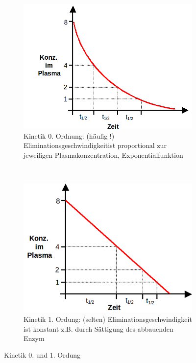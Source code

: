\documentclass[10pt,a4paper]{report}
\begin{document}
\begin{figure}[!htb]
    \centering
    \begin{subfigure}[b]{0.49\textwidth}
        \includegraphics[width=\textwidth]{Bilder/kinetik0.png}
        \caption{Kinetik 0. Ordnung: (häufig !) Eliminationsgeschwindigkeitist proportional 	zur jeweiligen Plasmakonzentration, Exponentialfunktion}
        \label{fig:transmebrandomaene}
    \end{subfigure}
    ~ %
    \begin{subfigure}[b]{0.43\textwidth}
        \includegraphics[width=\textwidth]{Bilder/kinetik1.png}
        \caption{Kinetik 1. Ordung: (selten) Eliminationsgeschwindigkeit ist konstant z.B. durch Sättigung des abbauenden Enzym}
        \label{fig:kinetik1}
    \end{subfigure}
    \caption{Kinetik 0. und 1. Ordung}
    \label{fig:struktur_na_kanal}
\end{figure}
\end{document}
